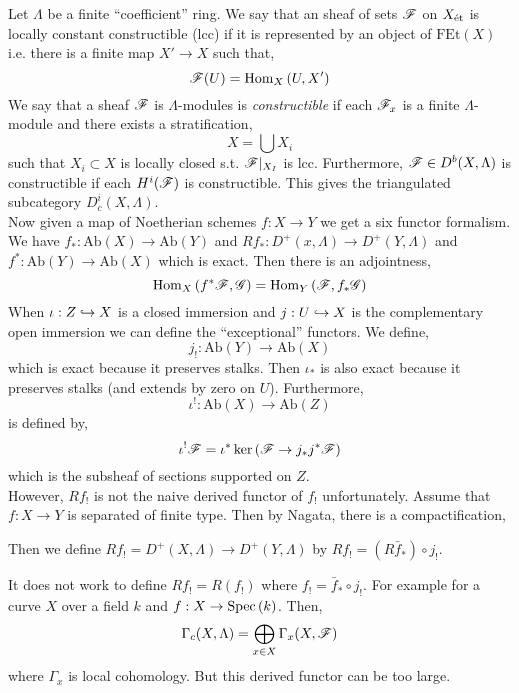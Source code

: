 \documentclass[12pt]{article}
\begin{document}
Let $\Lambda$ be a finite ``coefficient'' ring. We say that an \etale sheaf of sets $\mathscr{F}$ on $X_{\text{\'{e}t}}$ is locally constant constructible (lcc) if it is represented by an object of $\mathrm{FEt}(X)$ i.e. there is a finite \etale map $X' \to X$ such that,
\[ \mathscr{F}(U) = \mathrm{Hom}_{X} \left( U, X' \right) \]
We say that a sheaf $\mathscr{F}$ is $\Lambda$-modules is \textit{constructible} if each $\mathscr{F}_{x}$ is a finite $\Lambda$-module and there exists a stratification,
\[ X = \bigcup X_i \]
such that $X_i \subset X$ is locally closed s.t. $\mathscr{F}|_{X_I}$ is lcc. Furthermore, $\mathscr{F} \in D^b(X, \Lambda)$ is constructible if each $H^i(\mathscr{F})$ is constructible. This gives the triangulated subcategory $D_c^i(X, \Lambda)$.
\bigskip\\
Now given a map of Noetherian schemes $f : X \to Y$ we get a six functor formalism. We have $f_* : \mathrm{Ab}(X) \to \mathrm{Ab}(Y)$ and $R f_* : D^+(x, \Lambda) \to D^+(Y, \Lambda)$ and $f^* : \mathrm{Ab}(Y) \to \mathrm{Ab}(X)$ which is exact. Then there is an adjointness,
\[ \mathrm{Hom}_{X} \left( f^* \mathscr{F}, \mathscr{G} \right) = \mathrm{Hom}_{Y} \left( \mathscr{F}, f_* \mathscr{G} \right) \]
When $\iota : Z \hookrightarrow X$ is a closed immersion and $j : U \hookrightarrow X$ is the complementary  open immersion we can define the ``exceptional'' functors. We define,
\[ j_! : \mathrm{Ab}(Y) \to \mathrm{Ab}(X) \]
which is exact because it preserves stalks. Then $\iota_*$ is also exact because it preserves stalks (and extends by zero on $U$). Furthermore, 
\[ \iota^! : \mathrm{Ab}(X) \to \mathrm{Ab}(Z) \]
is defined by,
\[ \iota^! \mathscr{F} = \iota^* \ker{(\mathscr{F}\to j_* j^* \mathscr{F})} \]
which is the subsheaf of sections supported on $Z$. 
\bigskip\\
However, $R f_!$ is not the naive derived functor of $f_!$ unfortunately. Assume that $f : X \to Y$ is separated of finite type. Then by Nagata, there is a compactification,
\begin{center}
\end{center}
Then we define $R f_! = D^+(X, \Lambda) \to D^+(Y, \Lambda)$ by $R f_! = (R \bar{f}_*) \circ j_!$. 

\begin{rmk}
It does not work to define $R f_! = R(f_!)$ where $f_! = \bar{f}_* \circ j_!$. For example for a curve $X$ over a field $k$ and $f : X \to \mathrm{Spec}\left( k \right)$. Then,
\[ \Gamma_c(X, \Lambda) = \bigoplus_{x \in X} \Gamma_x(X, \mathscr{F}) \]
where $\Gamma_x$ is local cohomology. But this derived functor can be too large.
\end{rmk}
\end{document}
